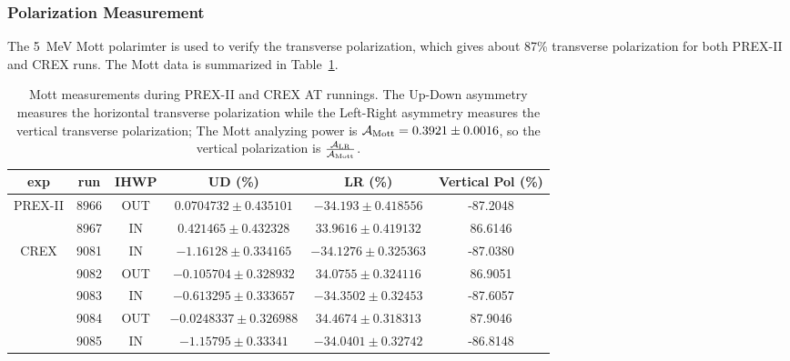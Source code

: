 \subsubsection{Polarization Measurement}
The 5~MeV Mott polarimter is used to verify the transverse polarization,
which gives about 87\% transverse polarization for both PREX-II and CREX runs.
The Mott data is summarized in Table~\ref{tab:AT_Mott}.
\begin{table}[!h]
    \begin{tabular}{c c c | c c | c}
	\hline
	exp & run & IHWP  & UD (\%)	& LR (\%)   & Vertical Pol (\%)	\\
	\hline
	\multirow{2}{*}{PREX-II}
	    & 8966  & OUT   & $0.0704732 \pm 0.435101$	& $-34.193 \pm 0.418556$	& -87.2048  \\
	    & 8967  & IN    & $0.421465 \pm 0.432328$	& $33.9616 \pm 0.419132$	&  86.6146  \\
	\hline
	\multirow{5}{*}{CREX}    
	    & 9081  & IN    & $-1.16128 \pm 0.334165$   & $-34.1276 \pm 0.325363$	& -87.0380  \\
	    & 9082  & OUT   & $-0.105704 \pm 0.328932$	& $34.0755 \pm 0.324116	$&  86.9051  \\
	    & 9083  & IN    & $-0.613295 \pm 0.333657$	& $-34.3502 \pm 0.32453	$& -87.6057  \\
	    & 9084  & OUT   & $-0.0248337 \pm 0.326988$	& $34.4674 \pm 0.318313	$&  87.9046  \\
	    & 9085  & IN    & $-1.15795 \pm 0.33341 $   & $-34.0401 \pm 0.32742	$& -86.8148  \\
	\hline
    \end{tabular}
    \caption{Mott measurements during PREX-II and CREX AT runnings. The Up-Down
    asymmetry measures the horizontal transverse polarization while the Left-Right
    asymmetry measures the vertical transverse polarization; The Mott analyzing 
    power is $\mathcal{A}_{\text{Mott}} = 0.3921 \pm 0.0016$, so the vertical polarization is 
    $\frac{\mathcal{A}_{\text{LR}}}{\mathcal{A}_{\text{Mott}}}$.} 
    \label{tab:AT_Mott}
\end{table}


